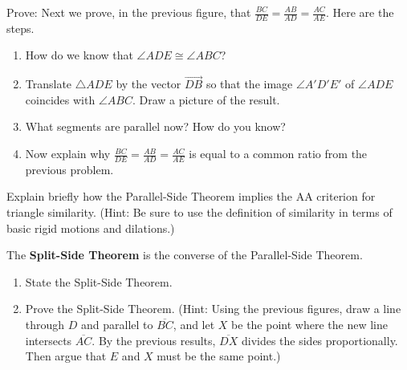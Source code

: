 \documentclass[nooutcomes]{ximera}
\begin{document}
\begin{problem}
Prove:  Next we prove, in the previous figure, that $ \frac{BC}{DE} = \frac{AB}{AD} = \frac{AC}{AE}$.  Here are the steps.  
\begin{enumerate}
\item How do we know that $\angle ADE \cong \angle ABC$?  
\item Translate $\triangle ADE$ by the vector $\overrightarrow{DB}$ so that the image $\angle A'D'E'$ of $\angle ADE$ coincides with $\angle ABC$.  Draw a picture of the result.  
\item What segments are parallel now?  How do you know?  
\item Now explain why $\frac{BC}{DE} = \frac{AB}{AD} = \frac{AC}{AE}$ is equal to a common ratio from the previous problem.  
\end{enumerate}
\vfill
\end{problem}

\newpage

\begin{problem}
Explain briefly how the Parallel-Side Theorem implies the AA criterion for triangle similarity.  (Hint: Be sure to use the definition of similarity in terms of basic rigid motions and dilations.)  
\vfill
\end{problem}

\begin{problem}
The \textbf{Split-Side Theorem} is the converse of the Parallel-Side Theorem.   
\begin{enumerate}
\item State the Split-Side Theorem.   
\item Prove the Split-Side Theorem.  (Hint:  Using the previous figures, draw a line through $D$ and parallel to $\overline{BC}$, and let $X$ be the point where the new line intersects $\overline{AC}$.  By the previous results, $\overline{DX}$ divides the sides proportionally.  Then argue that $E$ and $X$ must be the same point.)  
\end{enumerate}
\vfill
\end{problem}
\end{document}
